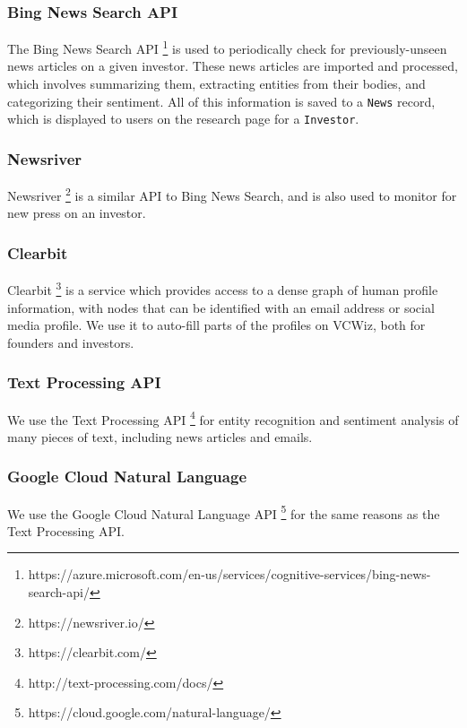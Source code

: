 \subsubsection{Bing News Search API}

The Bing News Search API \footnote{https://azure.microsoft.com/en-us/services/cognitive-services/bing-news-search-api/} is used to periodically check for previously-unseen news articles on a given investor. These news articles are imported and processed, which involves summarizing them, extracting entities from their bodies, and categorizing their sentiment. All of this information is saved to a \texttt{News} record, which is displayed to users on the research page for a \texttt{Investor}.

\subsubsection{Newsriver}

Newsriver \footnote{https://newsriver.io/} is a similar API to Bing News Search, and is also used to monitor for new press on an investor.

\subsubsection{Clearbit}

Clearbit \footnote{https://clearbit.com/} is a service which provides access to a dense graph of human profile information, with nodes that can be identified with an email address or social media profile. We use it to auto-fill parts of the profiles on VCWiz, both for founders and investors.

\subsubsection{Text Processing API}

We use the Text Processing API \footnote{http://text-processing.com/docs/} for entity recognition and sentiment analysis of many pieces of text, including news articles and emails.

\subsubsection{Google Cloud Natural Language}

We use the Google Cloud Natural Language API \footnote{https://cloud.google.com/natural-language/} for the same reasons as the Text Processing API.

